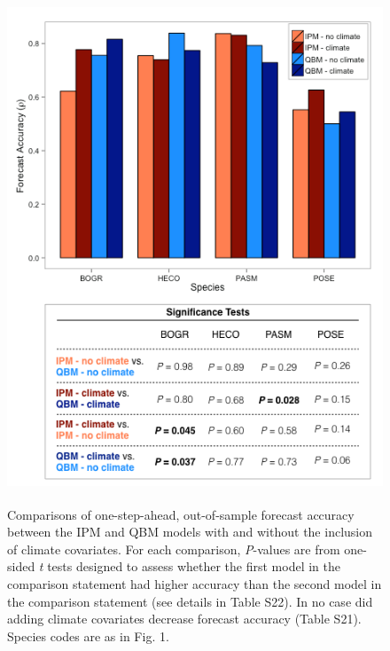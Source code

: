 \documentclass[12pt,]{article}
\begin{document}
\newpage{}

\begin{figure}[!ht]
  \centering
      \includegraphics[height=6in]{./components/forecast_accuracy_mockup.png}
  \caption{Comparisons of one-step-ahead, out-of-sample forecast accuracy between the IPM and QBM models with and without the inclusion of climate covariates. For each comparison, \emph{P}-values are from one-sided \emph{t} tests designed to assess whether the first model in the comparison statement had higher accuracy than the second model in the comparison statement (see details in Table S22). In no case did adding climate covariates decrease forecast accuracy (Table S21). Species codes are as in Fig. 1.}
\end{figure}

\newpage{}
\end{document}
